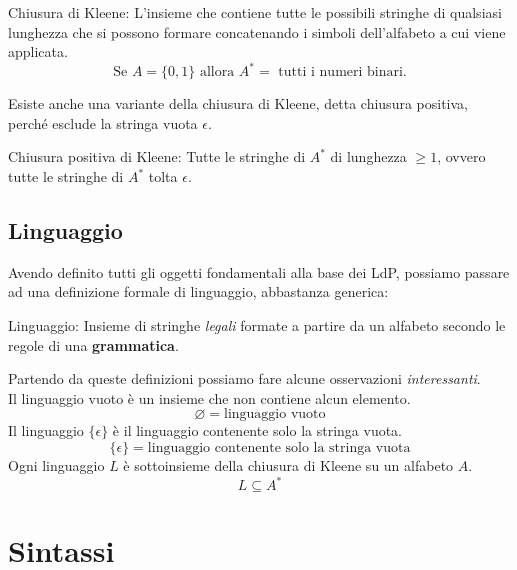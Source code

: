 \documentclass{article}
\begin{document}
\begin{dfn}{Chiusura di Kleene: }
    L'insieme che contiene tutte le possibili stringhe di qualsiasi lunghezza che si possono formare concatenando i simboli dell'alfabeto a cui viene applicata.
    \[\text{Se \(A = \{ 0, 1 \}\) allora \(A^* = \) tutti i numeri binari.}\]
\end{dfn}

Esiste anche una variante della chiusura di Kleene, detta chiusura positiva, perché esclude la stringa vuota \(\epsilon\).
\begin{dfn}{Chiusura positiva di Kleene: }
    Tutte le stringhe di \(A^*\) di lunghezza \(\geq 1\), ovvero tutte le stringhe di \(A^*\) tolta \(\epsilon\).
\end{dfn}

\subsection{Linguaggio}
Avendo definito tutti gli oggetti fondamentali alla base dei LdP, possiamo passare ad una definizione formale di linguaggio, abbastanza generica:

\begin{dfn}{Linguaggio: }
    Insieme di stringhe \emph{legali} formate a partire da un alfabeto secondo le regole di una \textbf{grammatica}.
\end{dfn}

Partendo da queste definizioni possiamo fare alcune osservazioni \emph{interessanti}.\\
Il linguaggio vuoto è un insieme che non contiene alcun elemento.
\[\varnothing = \text{linguaggio vuoto}\]
Il linguaggio \(\{ \epsilon \}\) è il linguaggio contenente solo la stringa vuota.
\[\{ \epsilon \} = \text{linguaggio contenente solo la stringa vuota}\]
Ogni linguaggio \(L\) è sottoinsieme della chiusura di Kleene su un alfabeto \(A\).
\[L \subseteq A^*\]

\pagebreak

\section{Sintassi}
\end{document}
